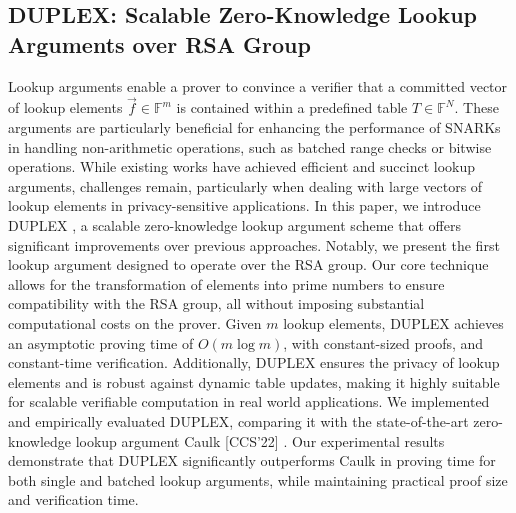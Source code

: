 \documentclass[11pt]{article}
\theoremstyle{definition}
\theoremstyle{remark}
\theoremstyle{plain}
\begin{document}
\subsection{\cite{10.1145/3708821.3733863} DUPLEX: Scalable Zero-Knowledge Lookup Arguments over RSA Group}
Lookup arguments enable a prover to convince a verifier that a committed vector of lookup elements $\vec{f} \in \mathbb{F}^m$ is contained within a predefined table $T \in \mathbb{F}^N$.  These arguments are particularly beneficial for enhancing the performance of SNARKs in handling non-arithmetic operations, such as batched range checks or bitwise operations. While existing works have achieved efficient and succinct lookup arguments, challenges remain, particularly when dealing with large vectors of lookup elements in privacy-sensitive applications. In this paper, we introduce DUPLEX , a scalable zero-knowledge lookup argument scheme that offers significant improvements over previous approaches. Notably, we present the first lookup argument designed to operate over the RSA group. Our core technique allows for the transformation of elements into prime numbers to ensure compatibility with the RSA group, all without imposing substantial computational costs on the prover. 
Given $m$ lookup elements, DUPLEX achieves an asymptotic proving time of $O(m \log m)$, with constant-sized proofs, and constant-time verification. 
Additionally, DUPLEX ensures the privacy of lookup elements and is robust against dynamic table updates, making it highly suitable for scalable verifiable computation in real world applications. 
We implemented and empirically evaluated DUPLEX, comparing it with the state-of-the-art zero-knowledge lookup argument Caulk [CCS'22] \cite{zapico2022caulk}. Our experimental results demonstrate that DUPLEX significantly outperforms Caulk in proving time for both single and batched lookup arguments, while maintaining practical proof size and verification time.
\end{document}
